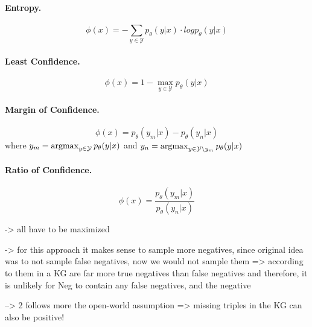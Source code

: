 \paragraph{\textbf{Entropy.}}
\begin{equation}
    \phi(x) = - \sum_{y \in \mathcal{Y}}{p_{\theta}(y | x) \cdot log p_{\theta}(y|x)}
\end{equation}

\paragraph{\textbf{Least Confidence.}}
\begin{equation}
    \phi(x) = 1 - \max_{y \in \mathcal{Y}}{p_{\theta}(y | x)}
\end{equation}

\paragraph{\textbf{Margin of Confidence.}}
\begin{equation}
    \phi(x) = p_{\theta}(y_m | x) - p_{\theta}(y_n|x)
\end{equation}
where
$y_m = \operatorname*{argmax}_{y \in \mathcal{Y}} p_{\theta}(y | x)$ 
and 
$y_n = \operatorname*{argmax}_{y \in \mathcal{Y} \setminus y_m}{p_{\theta}(y | x)}$
    
\paragraph{\textbf{Ratio of Confidence.}}
\begin{equation}
    \phi(x) = \frac{p_{\theta}(y_m | x)}{p_{\theta}(y_n|x)} 
\end{equation}



-> all have to be maximized





-> for this approach it makes sense to sample more negatives, since original idea was to not sample false negatives, now we would not sample them
=> according to them in a KG are far more true negatives than false negatives and therefore, it is unlikely for Neg to contain any false negatives, and the negative


--> 2 follows more the open-world assumption => missing triples in the KG can also be positive!





